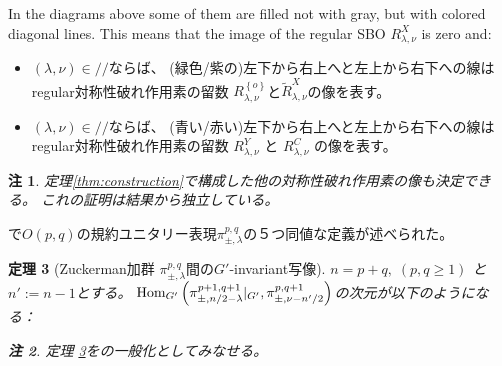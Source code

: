 \documentclass[12pt]{article} %
\newtheorem{theorem}{定理}
\newcommand{\Hom}{\mbox{\normalfont Hom}}
\newtheorem{remark}[theorem]{注}
\theoremstyle{definition}
\theoremstyle{exampstyle} \newtheorem{examp}[theorem]{Theorem}
\renewcommand{\ss}{//}
\begin{document}
	In the diagrams above some of them are filled not with gray, but with colored diagonal lines. This means that the image of the regular SBO $R_{\lambda,\nu}^X$ is zero and:
	\begin{itemize}
		\item $(\lambda,\nu)\in\ss$ならば、
	(緑色/紫の)左下から右上へと左上から右下への線はregular対称性破れ作用素の留数
	$R_{\lambda,\nu}^{ \left\{ o \right\}}$と$\tilde{R}_{\lambda,\nu}^X$の像を表す。
		\item $(\lambda,\nu)\in\ss$ならば、
	(青い/赤い)左下から右上へと左上から右下への線はregular対称性破れ作用素の留数
	$R_{\lambda,\nu}^{Y}$ と ${R}_{\lambda,\nu}^C$ の像を表す。
	\end{itemize}
\begin{remark}
	定理\ref{thm:construction}で構成した他の対称性破れ作用素の像も決定できる。
	これの証明は\cite{howe1993homogeneous}結果から独立している。
\end{remark}

\cite{KO2}で$O(p,q)$の規約ユニタリー表現$\pi_{\pm,\lambda}^{p,q}$の５つ同値な定義が述べられた。
\begin{theorem}[Zuckerman加群 $\pi_{\pm,\lambda}^{p,q}$間の$G'$-invariant写像]\label{thm:Aq}
	$n=p+q,\;(p,q\ge1)$ と $n':=n-1$とする。
	$\Hom_{G'}\left(\pi_{\pm,{n}/{2}-\lambda}^{p+1,q+1}\kern-0.3em\mid_{G'} ,\pi_{\pm,\nu-{n'}/{2}}^{p,q+1} \right)$の次元が以下のようになる：
	\newline
{}\\\vspace{\baselineskip}
\begin{remark}
定理 \ref{thm:Aq}を\cite[Thms. 12.1 and 1.3]{kobayashi2015symmetry}の一般化としてみなせる。
\end{remark}
\end{theorem}
\nocite{kobayashi2015program}
\small


\end{document}

